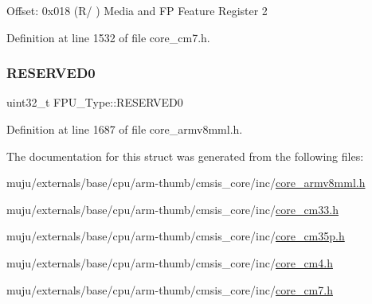Offset\+: 0x018 (R/ ) Media and FP Feature Register 2 

Definition at line 1532 of file core\+\_\+cm7.\+h.

\mbox{\label{struct_f_p_u___type_aeab77b3f17bf5a628cb743807d8fde7e}} 
\subsubsection{\texorpdfstring{R\+E\+S\+E\+R\+V\+E\+D0}{RESERVED0}}
{\footnotesize\ttfamily uint32\+\_\+t F\+P\+U\+\_\+\+Type\+::\+R\+E\+S\+E\+R\+V\+E\+D0}



Definition at line 1687 of file core\+\_\+armv8mml.\+h.



The documentation for this struct was generated from the following files\+:\begin{DoxyCompactItemize}
\item 
muju/externals/base/cpu/arm-\/thumb/cmsis\+\_\+core/inc/\hyperlink{core__armv8mml_8h}{core\+\_\+armv8mml.\+h}\item 
muju/externals/base/cpu/arm-\/thumb/cmsis\+\_\+core/inc/\hyperlink{core__cm33_8h}{core\+\_\+cm33.\+h}\item 
muju/externals/base/cpu/arm-\/thumb/cmsis\+\_\+core/inc/\hyperlink{core__cm35p_8h}{core\+\_\+cm35p.\+h}\item 
muju/externals/base/cpu/arm-\/thumb/cmsis\+\_\+core/inc/\hyperlink{core__cm4_8h}{core\+\_\+cm4.\+h}\item 
muju/externals/base/cpu/arm-\/thumb/cmsis\+\_\+core/inc/\hyperlink{core__cm7_8h}{core\+\_\+cm7.\+h}\end{DoxyCompactItemize}
